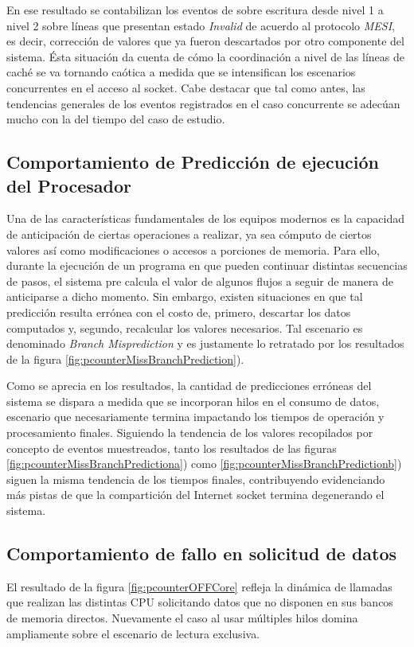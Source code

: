 En ese resultado se contabilizan los eventos de sobre escritura desde nivel 1 a nivel 2 sobre líneas que presentan estado \emph{Invalid} de acuerdo al protocolo \emph{MESI}, es decir, corrección de valores que ya fueron descartados por otro componente del sistema. Ésta situación da cuenta de cómo la coordinación a nivel de las líneas de caché se va tornando caótica a medida que se intensifican los escenarios concurrentes en el acceso al socket. Cabe destacar que tal como antes, las tendencias generales de los eventos registrados en el caso concurrente se adecúan mucho con la del tiempo del caso de estudio.

\subsection{Comportamiento de Predicción de ejecución del Procesador}
Una de las características fundamentales de los equipos modernos es la capacidad de anticipación de ciertas operaciones a realizar, ya sea cómputo de ciertos valores así como modificaciones o accesos a porciones de memoria. Para ello, durante la ejecución de un programa en que pueden continuar distintas secuencias de pasos, el sistema pre calcula el valor de algunos flujos a seguir de manera de anticiparse a dicho momento. Sin embargo, existen situaciones en que tal predicción resulta errónea con el costo de, primero, descartar los datos computados y, segundo, recalcular los valores necesarios. Tal escenario es denominado \emph{Branch Misprediction} y es justamente lo retratado por los resultados de la figura \ref{fig:pcounterMissBranchPrediction}).

Como se aprecia en los resultados, la cantidad de predicciones erróneas del sistema se dispara a medida que se incorporan hilos en el consumo de datos, escenario que necesariamente termina impactando los tiempos de operación y procesamiento finales. Siguiendo la tendencia de los valores recopilados por concepto de eventos muestreados, tanto los resultados de las figuras \ref{fig:pcounterMissBranchPredictiona}) como \ref{fig:pcounterMissBranchPredictionb}) siguen la misma tendencia de los tiempos finales, contribuyendo evidenciando más pistas de que la compartición del Internet socket termina degenerando el sistema.

\subsection{Comportamiento de fallo en solicitud de datos}
El resultado de la figura \ref{fig:pcounterOFFCore} refleja la dinámica de llamadas que realizan las distintas CPU solicitando datos que no disponen en sus bancos de memoria directos. Nuevamente el caso al usar múltiples hilos domina ampliamente sobre el escenario de lectura exclusiva.

